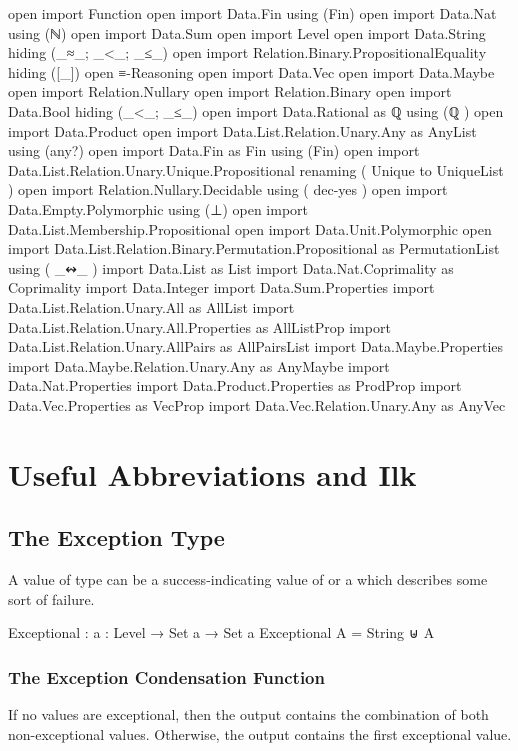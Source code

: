 \documentclass{report}
\begin{document}
\begin{code}
open import Function
open import Data.Fin using (Fin)
open import Data.Nat using (ℕ)
open import Data.Sum
open import Level
open import Data.String hiding (_≈_; _<_; _≤_)
open import Relation.Binary.PropositionalEquality hiding ([_])
open ≡-Reasoning
open import Data.Vec
open import Data.Maybe
open import Relation.Nullary
open import Relation.Binary
open import Data.Bool hiding (_<_; _≤_)
open import Data.Rational
  as ℚ
  using (ℚ
        )
open import Data.Product
open import Data.List.Relation.Unary.Any as AnyList using (any?)
open import Data.Fin as Fin using (Fin)
open import Data.List.Relation.Unary.Unique.Propositional
  renaming
    ( Unique to UniqueList
    )
open import Relation.Nullary.Decidable
  using
    ( dec-yes
    )
open import Data.Empty.Polymorphic using (⊥)
open import Data.List.Membership.Propositional
open import Data.Unit.Polymorphic
open import Data.List.Relation.Binary.Permutation.Propositional
  as PermutationList
  using
    ( _↭_
    )
import Data.List as List
import Data.Nat.Coprimality as Coprimality
import Data.Integer
import Data.Sum.Properties
import Data.List.Relation.Unary.All as AllList
import Data.List.Relation.Unary.All.Properties as AllListProp
import Data.List.Relation.Unary.AllPairs as AllPairsList
import Data.Maybe.Properties
import Data.Maybe.Relation.Unary.Any as AnyMaybe
import Data.Nat.Properties
import Data.Product.Properties as ProdProp
import Data.Vec.Properties as VecProp
import Data.Vec.Relation.Unary.Any as AnyVec
\end{code}

\chapter{Useful Abbreviations and Ilk}

\section{The Exception Type}
A value of type   can be a success-indicating value of  or a  which describes some sort of failure.

\begin{code}
Exceptional : {a : Level} → Set a → Set a
Exceptional A = String ⊎ A
\end{code}

\subsection{The Exception Condensation Function}
If no values are exceptional, then the output contains the combination of both non-exceptional values.  Otherwise, the output contains the first exceptional value.
\end{document}
